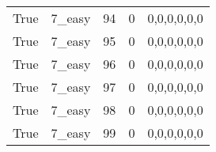 \begin{tabular}{llrrl}
 True            & 7\_easy              &            94 &                     0 & 0,0,0,0,0,0   \\
 True            & 7\_easy              &            95 &                     0 & 0,0,0,0,0,0   \\
 True            & 7\_easy              &            96 &                     0 & 0,0,0,0,0,0   \\
 True            & 7\_easy              &            97 &                     0 & 0,0,0,0,0,0   \\
 True            & 7\_easy              &            98 &                     0 & 0,0,0,0,0,0   \\
 True            & 7\_easy              &            99 &                     0 & 0,0,0,0,0,0   \\
\hline
\end{tabular}